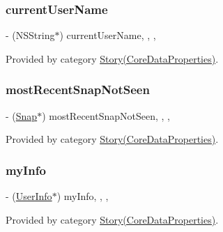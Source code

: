 \subsubsection{\texorpdfstring{current\+User\+Name}{currentUserName}}
{\footnotesize\ttfamily -\/ (N\+S\+String$\ast$) current\+User\+Name\hspace{0.3cm}{\ttfamily [read]}, {\ttfamily [write]}, {\ttfamily [nonatomic]}, {\ttfamily [retain]}}



Provided by category \hyperlink{category_story_07_core_data_properties_08_a1d58b14f07e9d3fbab4a4703a066bfc2}{Story(\+Core\+Data\+Properties)}.

\hypertarget{interface_story_a3034a750fc40fc2b0985d5a7f5213909}{}\label{interface_story_a3034a750fc40fc2b0985d5a7f5213909} 
\subsubsection{\texorpdfstring{most\+Recent\+Snap\+Not\+Seen}{mostRecentSnapNotSeen}}
{\footnotesize\ttfamily -\/ (\hyperlink{interface_snap}{Snap}$\ast$) most\+Recent\+Snap\+Not\+Seen\hspace{0.3cm}{\ttfamily [read]}, {\ttfamily [write]}, {\ttfamily [nonatomic]}, {\ttfamily [retain]}}



Provided by category \hyperlink{category_story_07_core_data_properties_08_a3034a750fc40fc2b0985d5a7f5213909}{Story(\+Core\+Data\+Properties)}.

\hypertarget{interface_story_a5f52fcbdeb0aabdd93d2a4312bb9759e}{}\label{interface_story_a5f52fcbdeb0aabdd93d2a4312bb9759e} 
\subsubsection{\texorpdfstring{my\+Info}{myInfo}}
{\footnotesize\ttfamily -\/ (\hyperlink{interface_user_info}{User\+Info}$\ast$) my\+Info\hspace{0.3cm}{\ttfamily [read]}, {\ttfamily [write]}, {\ttfamily [nonatomic]}, {\ttfamily [retain]}}



Provided by category \hyperlink{category_story_07_core_data_properties_08_a5f52fcbdeb0aabdd93d2a4312bb9759e}{Story(\+Core\+Data\+Properties)}.

